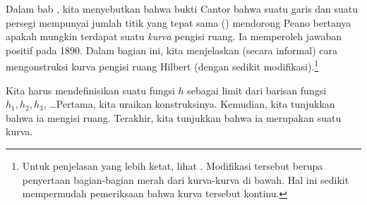 \documentclass[../../../include/open-logic-section]{subfiles}
\begin{document}


Dalam bab , kita menyebutkan bahwa bukti Cantor bahwa
suatu garis dan suatu persegi mempunyai jumlah titik yang tepat sama
() mendorong Peano bertanya
apakah mungkin terdapat suatu \emph{kurva} pengisi ruang. Ia memperoleh
jawaban positif pada 1890. Dalam bagian ini, kita menjelaskan (secara
informal) cara mengonstruksi kurva pengisi ruang Hilbert (dengan sedikit
modifikasi).\footnote{Untuk penjelasan yang lebih ketat, lihat
\cite{Rose2010}. Modifikasi tersebut berupa penyertaan bagian-bagian merah
dari kurva-kurva di bawah. Hal ini sedikit mempermudah pemeriksaan
bahwa kurva tersebut kontinu.}

Kita harus mendefinisikan suatu fungsi $h$ sebagai limit dari barisan fungsi
$h_1,h_2,h_3$, \dots\@ Pertama, kita uraikan konstruksinya. Kemudian, kita
tunjukkan bahwa ia mengisi ruang. Terakhir, kita tunjukkan bahwa ia
merupakan suatu kurva.
\end{document}
